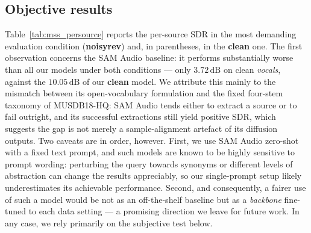 \subsection{Objective results}
\label{ssec:mss_res_obj}

Table~\ref{tab:mss_persource} reports the per-source \acrshort{SDR} in the most
demanding evaluation condition (\textbf{noisyrev}) and, in parentheses, in the
\textbf{clean} one. The first observation concerns the SAM Audio baseline: it
performs substantially worse than all our models under both conditions --- only
$3.72\,\text{dB}$ on clean \emph{vocals}, against the $10.05\,\text{dB}$ of our
\textbf{clean} model. We attribute this mainly to the mismatch between its
open-vocabulary formulation and the fixed four-stem taxonomy of MUSDB18-HQ:
SAM Audio tends either to extract a source or to fail outright, and its
successful extractions still yield positive \acrshort{SDR}, which suggests the
gap is not merely a sample-alignment artefact of its diffusion outputs. Two
caveats are in order, however. First, we use SAM Audio zero-shot with a fixed
text prompt, and such models are known to be highly sensitive to prompt wording:
perturbing the query towards synonyms or different levels of abstraction can
change the results appreciably, so our single-prompt setup likely
underestimates its achievable performance. Second, and consequently, a fairer
use of such a model would be not as an off-the-shelf baseline but as a
\emph{backbone} fine-tuned to each data setting --- a promising direction we leave
for future work. In any case, we rely primarily on the subjective test below.

